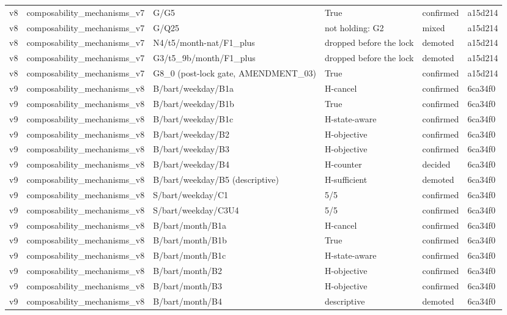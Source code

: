 \begin{longtable}{llllll}
v8 & composability\_mechanisms\_v7 & G/G5 & True & confirmed & a15d214 \\
v8 & composability\_mechanisms\_v7 & G/Q25 & not holding: G2 & mixed & a15d214 \\
v8 & composability\_mechanisms\_v7 & N4/t5/month-nat/F1\_plus & dropped before the lock & demoted & a15d214 \\
v8 & composability\_mechanisms\_v7 & G3/t5\_9b/month/F1\_plus & dropped before the lock & demoted & a15d214 \\
v8 & composability\_mechanisms\_v7 & G8\_0 (post-lock gate, AMENDMENT\_03) & True & confirmed & a15d214 \\
v9 & composability\_mechanisms\_v8 & B/bart/weekday/B1a & H-cancel & confirmed & 6ca34f0 \\
v9 & composability\_mechanisms\_v8 & B/bart/weekday/B1b & True & confirmed & 6ca34f0 \\
v9 & composability\_mechanisms\_v8 & B/bart/weekday/B1c & H-state-aware & confirmed & 6ca34f0 \\
v9 & composability\_mechanisms\_v8 & B/bart/weekday/B2 & H-objective & confirmed & 6ca34f0 \\
v9 & composability\_mechanisms\_v8 & B/bart/weekday/B3 & H-objective & confirmed & 6ca34f0 \\
v9 & composability\_mechanisms\_v8 & B/bart/weekday/B4 & H-counter & decided & 6ca34f0 \\
v9 & composability\_mechanisms\_v8 & B/bart/weekday/B5 (descriptive) & H-sufficient & demoted & 6ca34f0 \\
v9 & composability\_mechanisms\_v8 & S/bart/weekday/C1 & 5/5 & confirmed & 6ca34f0 \\
v9 & composability\_mechanisms\_v8 & S/bart/weekday/C3U4 & 5/5 & confirmed & 6ca34f0 \\
v9 & composability\_mechanisms\_v8 & B/bart/month/B1a & H-cancel & confirmed & 6ca34f0 \\
v9 & composability\_mechanisms\_v8 & B/bart/month/B1b & True & confirmed & 6ca34f0 \\
v9 & composability\_mechanisms\_v8 & B/bart/month/B1c & H-state-aware & confirmed & 6ca34f0 \\
v9 & composability\_mechanisms\_v8 & B/bart/month/B2 & H-objective & confirmed & 6ca34f0 \\
v9 & composability\_mechanisms\_v8 & B/bart/month/B3 & H-objective & confirmed & 6ca34f0 \\
v9 & composability\_mechanisms\_v8 & B/bart/month/B4 & descriptive & demoted & 6ca34f0 \\

\end{longtable}
